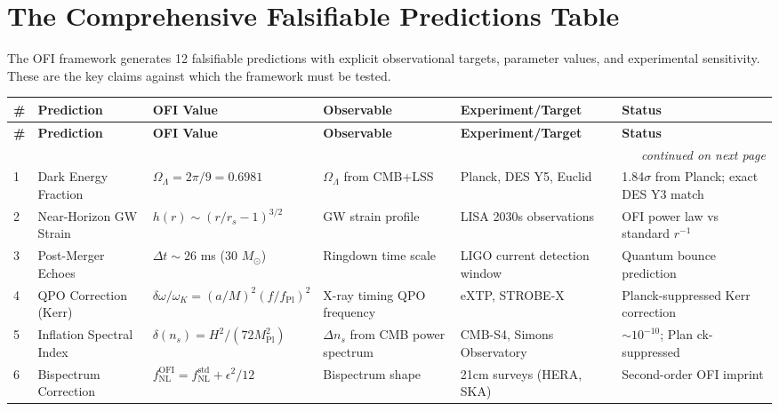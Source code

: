 \documentclass[12pt,a4paper]{article}
\theoremstyle{definition}
\newcommand{\OFI}{\text{OFI}}
\begin{document}
\section{The Comprehensive Falsifiable Predictions Table}

The OFI framework generates 12 falsifiable predictions with explicit observational targets, parameter values, and experimental sensitivity. These are the key claims against which the framework must be tested.

\begin{center}
\begin{longtable}{|p{0.8cm}|p{2.2cm}|p{1.8cm}|p{1.8cm}|p{2.0cm}|p{1.4cm}|}
\hline
\textbf{\#} & \textbf{Prediction} & \textbf{OFI Value} & \textbf{Observable} & \textbf{Experiment/Target} & \textbf{Status} \\
\hline
\endfirsthead
\hline
\textbf{\#} & \textbf{Prediction} & \textbf{OFI Value} & \textbf{Observable} & \textbf{Experiment/Target} & \textbf{Status} \\
\hline
\endhead
\multicolumn{6}{r}{\textit{continued on next page}} \\
\endfoot
\endlastfoot

1 & Dark Energy Fraction & $\Omega_\Lambda = 2\pi/9 = 0.6981$ & $\Omega_\Lambda$ from CMB+LSS & Planck, DES Y5, Euclid & 1.84$\sigma$ from Planck; exact DES Y3 match \\
\hline

2 & Near-Horizon GW Strain & $h(r) \sim (r/r_s - 1)^{3/2}$ & GW strain profile & LISA 2030s observations & OFI power law vs standard $r^{-1}$ \\
\hline

3 & Post-Merger Echoes & $\Delta t \sim 26$ ms (30 $M_\odot$) & Ringdown time scale & LIGO current detection window & Quantum bounce prediction \\
\hline

4 & QPO Correction (Kerr) & $\delta \omega / \omega_K = (a/M)^2 (f/f_{\text{Pl}})^2$ & X-ray timing QPO frequency & eXTP, STROBE-X & Planck-suppressed Kerr correction \\
\hline

5 & Inflation Spectral Index & $\delta(n_s) = H^2 / (72 M_{\text{Pl}}^2)$ & $\Delta n_s$ from CMB power spectrum & CMB-S4, Simons Observatory & $\sim 10^{-10}$; Plan ck-suppressed \\
\hline

6 & Bispectrum Correction & $f_{\text{NL}}^{\OFI} = f_{\text{NL}}^{\text{std}} + \epsilon^2/12$ & Bispectrum shape & 21cm surveys (HERA, SKA) & Second-order OFI imprint \\
\hline


\end{longtable}
\end{center}
\end{document}
